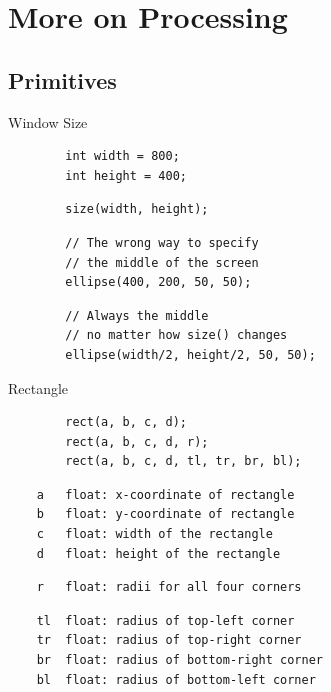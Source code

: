 \section{More on Processing}

\subsection{Primitives}
\begin{frame}[fragile]{Window Size}{}
    \Large
    \begin{verbatim}
        int width = 800;
        int height = 400;
    \end{verbatim}
    \pause
    \begin{verbatim}
        size(width, height);
    \end{verbatim}
    \pause
    \begin{verbatim}
        // The wrong way to specify
        // the middle of the screen
        ellipse(400, 200, 50, 50);
    \end{verbatim}
    \pause
    \begin{verbatim}
        // Always the middle
        // no matter how size() changes
        ellipse(width/2, height/2, 50, 50);
    \end{verbatim}
\end{frame}

\begin{frame}[fragile]{Rectangle}{}
    \Large
    \begin{verbatim}
        rect(a, b, c, d);
        rect(a, b, c, d, r);
        rect(a, b, c, d, tl, tr, br, bl);
    \end{verbatim}
    \pause
    \begin{verbatim}
    a   float: x-coordinate of rectangle
    b   float: y-coordinate of rectangle
    c   float: width of the rectangle
    d   float: height of the rectangle
    \end{verbatim}
    \pause
    \begin{verbatim}
    r   float: radii for all four corners
    \end{verbatim}
    \pause
    \begin{verbatim}
    tl  float: radius of top-left corner
    tr  float: radius of top-right corner
    br  float: radius of bottom-right corner
    bl  float: radius of bottom-left corner
    \end{verbatim}
\end{frame}

